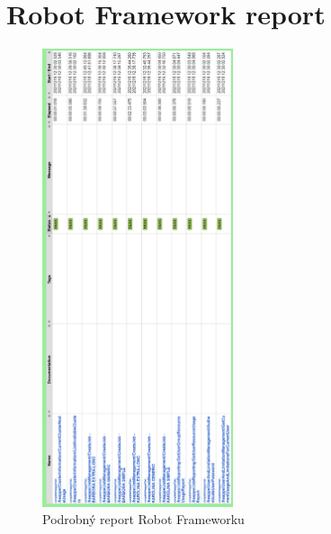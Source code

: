 \chapter{Robot Framework report}
\begin{figure}[!h]
	\centering
	\includegraphics[width=0.5\textwidth]{Figures/robot-framework-report-full.png}
	\caption{Podrobný report Robot Frameworku}
    \label{fig:WritingThesis}
\end{figure}
